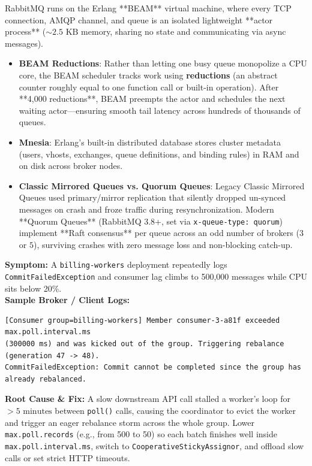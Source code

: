 RabbitMQ runs on the Erlang **BEAM** virtual machine, where every TCP connection, AMQP channel, and queue is an isolated lightweight **actor process** ($\sim 2.5\text{ KB}$ memory, sharing no state and communicating via async messages).
\begin{itemize}[leftmargin=18pt]
  \item \textbf{BEAM Reductions}: Rather than letting one busy queue monopolize a CPU core, the BEAM scheduler tracks work using \textbf{reductions} (an abstract counter roughly equal to one function call or built-in operation). After **4,000 reductions**, BEAM preempts the actor and schedules the next waiting actor---ensuring smooth tail latency across hundreds of thousands of queues.
  \item \textbf{Mnesia}: Erlang's built-in distributed database stores cluster metadata (users, vhosts, exchanges, queue definitions, and binding rules) in RAM and on disk across broker nodes.
  \item \textbf{Classic Mirrored Queues vs. Quorum Queues}: Legacy Classic Mirrored Queues used primary/mirror replication that silently dropped un-synced messages on crash and froze traffic during resynchronization. Modern **Quorum Queues** (RabbitMQ 3.8+, set via \texttt{x-queue-type: quorum}) implement **Raft consensus** per queue across an odd number of brokers ($3$ or $5$), surviving crashes with zero message loss and non-blocking catch-up.
\end{itemize}

\begin{realworldbox}
\textbf{Symptom:} A \texttt{billing-workers} deployment repeatedly logs \texttt{CommitFailedException} and consumer lag climbs to 500,000 messages while CPU sits below 20\%.\\
\textbf{Sample Broker / Client Logs:}
\begin{verbatim}
[Consumer group=billing-workers] Member consumer-3-a81f exceeded max.poll.interval.ms
(300000 ms) and was kicked out of the group. Triggering rebalance (generation 47 -> 48).
CommitFailedException: Commit cannot be completed since the group has already rebalanced.
\end{verbatim}
\textbf{Root Cause \& Fix:} A slow downstream API call stalled a worker's loop for $>5\text{ minutes}$ between \texttt{poll()} calls, causing the coordinator to evict the worker and trigger an eager rebalance storm across the whole group. Lower \texttt{max.poll.records} (e.g., from 500 to 50) so each batch finishes well inside \texttt{max.poll.interval.ms}, switch to \texttt{CooperativeStickyAssignor}, and offload slow calls or set strict HTTP timeouts.
\end{realworldbox}

